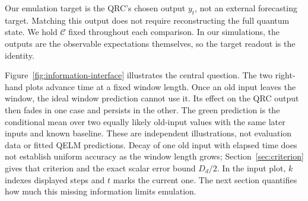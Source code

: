 Our emulation target is the QRC's chosen output $y_t$, not an external
forecasting target. Matching this output does not require reconstructing
the full quantum state. We hold $\mathcal C$ fixed throughout each
comparison. In our simulations, the outputs are the observable
expectations themselves, so the target readout is the identity.

Figure~\ref{fig:information-interface} illustrates the central question.
The two right-hand plots advance time at a fixed window length. Once an
old input leaves the window, the ideal window prediction cannot use it.
Its effect on the QRC output then fades in one case and persists in the
other. The green prediction is the conditional mean over two equally likely
old-input values with the same later inputs and known baseline.
These are independent illustrations, not evaluation data or fitted QELM
predictions. Decay of one old input with elapsed time does not establish
uniform accuracy as the window length grows; Section~\ref{sec:criterion}
gives that criterion and the exact scalar error bound $D_d/2$. In the input plot,
$k$ indexes displayed steps and $t$ marks the current one.
The next section quantifies how much this missing information limits
emulation.
